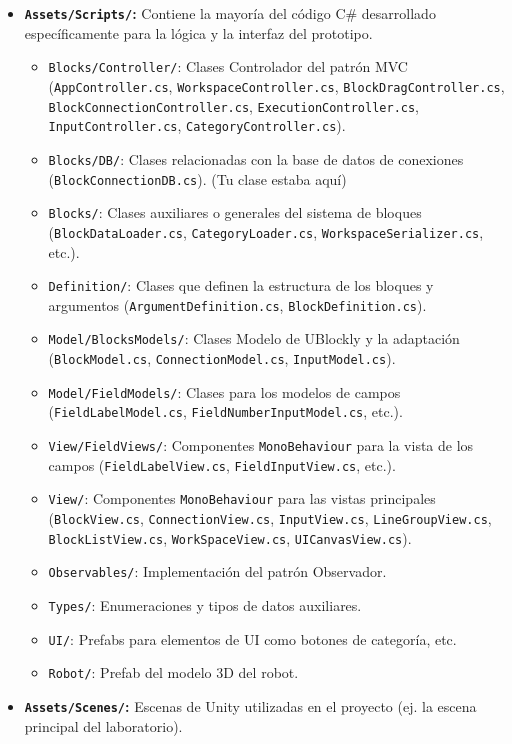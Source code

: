 \begin{itemize}
\begin{itemize}
\begin{itemize}
		\end{itemize}
		Es en esta carpeta de prefabs donde se tienen que incluir los diferentes bloques que se diseñen para cada una de las categorías que hay.
		\end{itemize}
	\item \textbf{\texttt{Assets/Scripts/}:} Contiene la mayoría del código C\# desarrollado específicamente para la lógica y la interfaz del prototipo.
	\begin{itemize}
		\item \texttt{Blocks/Controller/}: Clases Controlador del patrón MVC (\texttt{AppController.cs}, \texttt{WorkspaceController.cs}, \texttt{BlockDragController.cs}, \texttt{BlockConnectionController.cs}, \texttt{ExecutionController.cs}, \texttt{InputController.cs}, \texttt{CategoryController.cs}).
		\item \texttt{Blocks/DB/}: Clases relacionadas con la base de datos de conexiones (\texttt{BlockConnectionDB.cs}). (Tu clase estaba aquí)
		\item \texttt{Blocks/}: Clases auxiliares o generales del sistema de bloques (\texttt{BlockDataLoader.cs}, \texttt{CategoryLoader.cs}, \texttt{WorkspaceSerializer.cs}, etc.).
		\item \texttt{Definition/}: Clases que definen la estructura de los bloques y argumentos (\texttt{ArgumentDefinition.cs}, \texttt{BlockDefinition.cs}).
		\item \texttt{Model/BlocksModels/}: Clases Modelo de UBlockly y la adaptación (\texttt{BlockModel.cs}, \texttt{ConnectionModel.cs}, \texttt{InputModel.cs}). 
		\item \texttt{Model/FieldModels/}: Clases para los modelos de campos (\texttt{FieldLabelModel.cs}, \texttt{FieldNumberInputModel.cs}, etc.).
		\item \texttt{View/FieldViews/}: Componentes \texttt{MonoBehaviour} para la vista de los campos (\texttt{FieldLabelView.cs}, \texttt{FieldInputView.cs}, etc.).
		\item \texttt{View/}: Componentes \texttt{MonoBehaviour} para las vistas principales (\texttt{BlockView.cs}, \texttt{ConnectionView.cs}, \texttt{InputView.cs}, \texttt{LineGroupView.cs}, \texttt{BlockListView.cs}, \texttt{WorkSpaceView.cs}, \texttt{UICanvasView.cs}).
		\item \texttt{Observables/}: Implementación del patrón Observador.
		\item \texttt{Types/}: Enumeraciones y tipos de datos auxiliares.
	\end{itemize}

	\begin{itemize}
		
		\item \texttt{UI/}: Prefabs para elementos de UI como botones de categoría, etc.
		\item \texttt{Robot/}: Prefab del modelo 3D del robot.
	\end{itemize}
	\item \textbf{\texttt{Assets/Scenes/}:} Escenas de Unity utilizadas en el proyecto (ej. la escena principal del laboratorio).

\end{itemize}
